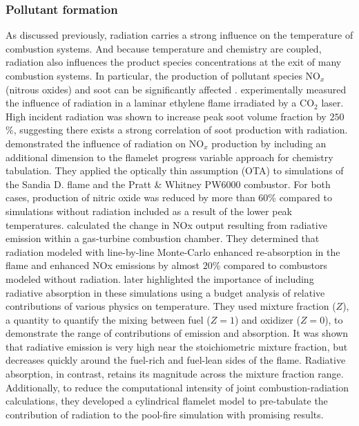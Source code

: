 \subsubsection{Pollutant formation}
As discussed previously, radiation carries a strong influence on the temperature of combustion systems. 
And because temperature and chemistry are coupled, radiation also influences the product species concentrations at the exit of many combustion systems. In particular, the production of pollutant species NO$_x$ (nitrous oxides) and soot can be significantly affected \cite{Viskanta2010RadiativeSystems}.
\citet{Medwell2011TheRadiation} experimentally measured the influence of radiation in a laminar ethylene flame irradiated by a CO$_2$ laser. High incident radiation was shown to increase peak soot volume fraction by $250$\%, suggesting there exists a strong correlation of soot production with radiation.
\citet{Ihme2008ModelingFormulation} demonstrated the influence of radiation on NO$_x$ production by including an additional dimension to the flamelet progress variable approach for chemistry tabulation.
They applied the optically thin assumption (OTA) to simulations of the Sandia D. flame and the Pratt \& Whitney PW6000 combustor.
For both cases, production of nitric oxide was reduced by more than $60$\% compared to simulations without radiation included as a result of the lower peak temperatures. \citet{Ren2017MonteChamber} calculated the change in NOx output resulting from radiative emission within a gas-turbine combustion chamber. They determined that radiation modeled with line-by-line Monte-Carlo enhanced re-absorption in the flame and enhanced NOx emissions by almost $20$\% compared to combustors modeled without radiation.
\citet{Wu2021LimitationsFires} later highlighted the importance of including radiative absorption in these simulations using a budget analysis of relative contributions of various physics on temperature. 
They used mixture fraction ($Z$), a quantity to quantify the mixing between fuel ($Z=1$) and oxidizer ($Z=0$), to demonstrate the range of contributions of emission and absorption.
It was shown that radiative emission is very high near the stoichiometric mixture fraction, but decreases quickly around the fuel-rich and fuel-lean sides of the flame. Radiative absorption, in contrast, retains its magnitude across the mixture fraction range.
Additionally, to reduce the computational intensity of joint combustion-radiation calculations, they developed a cylindrical flamelet model to pre-tabulate the contribution of radiation to the pool-fire simulation with promising results.

